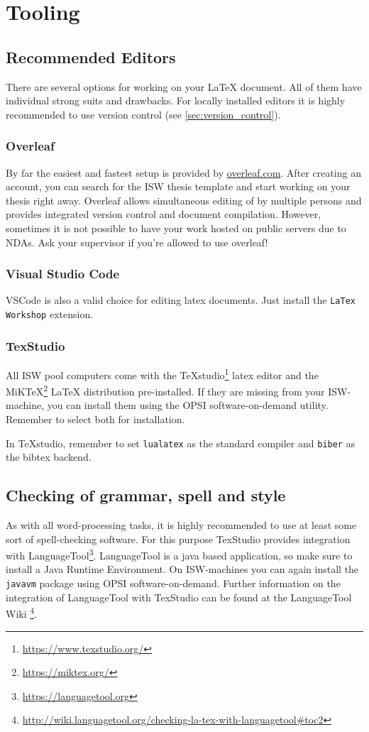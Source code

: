 \chapter{Tooling}

\section{Recommended Editors}
There are several options for working on your LaTeX document. All of them have individual strong suits and drawbacks. For locally installed editors it is highly recommended to use version control (see \autoref{sec:version_control}).

\subsection{Overleaf}
By far the easiest and fastest setup is provided by \url{overleaf.com}. After creating an account, you can search for the \ac{ISW} thesis template and start working on your thesis right away. Overleaf allows simultaneous editing of by multiple persons and provides integrated version control and document compilation.
However, sometimes it is not possible to have your work hosted on public servers due to \acp{NDA}. Ask your supervisor if you're allowed to use overleaf!

\subsection{Visual Studio Code}
VSCode is also a valid choice for editing latex documents. Just install the \texttt{LaTex Workshop} extension.

\subsection{TexStudio}
All \ac{ISW} pool computers come with the TeXstudio\footnote{\url{https://www.texstudio.org/}} latex editor and the MiKTeX\footnote{\url{https://miktex.org/}} LaTeX distribution pre-installed. If they are missing from your \ac{ISW}-machine, you can install them using the OPSI software-on-demand utility. Remember to select both for installation.

In TeXstudio, remember to set \texttt{lualatex} as the standard compiler and \texttt{biber} as the bibtex backend.

\section{Checking of grammar, spell and style}
As with all word-processing tasks, it is highly recommended to use at least some sort of spell-checking software.
For this purpose TexStudio provides integration with LanguageTool\footnote{\url{https://languagetool.org}}. LanguageTool is a java based application, so make sure to install a Java Runtime Environment. On \ac{ISW}-machines  you can again install the \texttt{javavm} package using OPSI software-on-demand. Further information on the integration of LanguageTool with TexStudio can be found at the LanguageTool Wiki \footnote{\url{http://wiki.languagetool.org/checking-la-tex-with-languagetool\#toc2}}.

